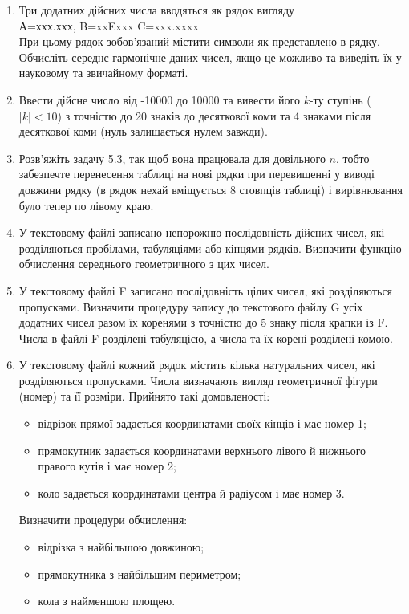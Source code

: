 \documentclass[a5paper,titlepage,openany,twoside,
]
{book_unv}%
\begin{document}
\begin{enumerate}
\begin{enumerate}
\item
  Три додатних дійсних числа вводяться як рядок вигляду \\
  А=ххх.ххх, B=xxExxx C=xxx.xxxx\\
  При цьому рядок зобов'язаний містити символи як представлено в рядку.  
Обчисліть середнє гармонічне даних чисел, якщо це можливо 
та виведіть їх у науковому та звичайному форматі.
\item
  Ввести дійсне число від -10000 до 10000 та вивести його $k$-ту ступінь
  ($|k|<10$) з точністю до 20 знаків до десяткової коми та 4
  знаками після десяткової коми (нуль залишається нулем завжди).

\item 
Розв'яжіть задачу 5.3, так щоб вона працювала для довільного $n$, тобто
забезпечте перенесення таблиці на нові рядки при перевищенні у виводі довжини рядку
(в рядок нехай вміщується 8 стовпців таблиці) і вирівнювання було тепер по лівому краю.

\item
У текстовому файлі записано непорожню послідовність дійсних чисел,
які розділяються пробілами, табуляціями або кінцями рядків.
 Визначити функцію обчислення середнього геометричного з цих чисел.

\item
У текстовому файлі F записано послідовність цілих чисел, які розділяються пропусками. 
Визначити процедуру запису до текстового файлу G усіх додатних чисел разом їх коренями з 
точністю до 5 знаку після крапки із F. Числа в файлі F розділені табуляцією, 
а числа та їх корені розділені комою.

\item
У текстовому файлі кожний рядок містить кілька натуральних чисел, які розділяються пропусками.
Числа визначають вигляд геометричної фігури (номер) та її розміри. Прийнято такі домовленості:
\begin{itemize}
\item
відрізок прямої задається координатами своїх кінців і має номер 1;
\item
прямокутник задається координатами верхнього лівого й нижнього правого кутів і має номер 2;
\item
коло задається координатами центра й радіусом і має номер 3.
\end{itemize}

Визначити процедури обчислення:
\begin{itemize}
\item відрізка з найбільшою довжиною;
\item прямокутника з найбільшим периметром;
\item кола з найменшою площею.
\end{itemize}



\end{enumerate}
\end{enumerate}
\end{document}
